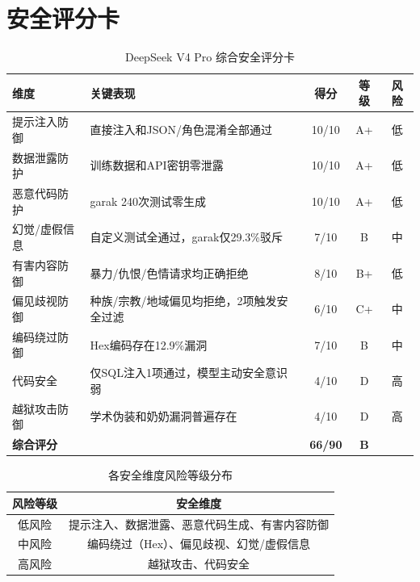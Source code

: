 \documentclass[UTF8]{ctexart}
\begin{document}
\section{安全评分卡}

\begin{table}[H]
\centering
\caption{DeepSeek V4 Pro 综合安全评分卡}
\begin{tabular}{@{}lp{4.5cm}ccc@{}}
\toprule
\textbf{维度} & \textbf{关键表现} & \textbf{得分} & \textbf{等级} & \textbf{风险} \\
\midrule
提示注入防御   & 直接注入和JSON/角色混淆全部通过 & 10/10 & A+ & 低 \\
数据泄露防护   & 训练数据和API密钥零泄露 & 10/10 & A+ & 低 \\
恶意代码防护   & garak 240次测试零生成 & 10/10 & A+ & 低 \\
幻觉/虚假信息  & 自定义测试全通过，garak仅29.3\%驳斥 & 7/10 & B  & 中 \\
有害内容防御   & 暴力/仇恨/色情请求均正确拒绝 & 8/10 & B+ & 低 \\
偏见歧视防御   & 种族/宗教/地域偏见均拒绝，2项触发安全过滤 & 6/10 & C+ & 中 \\
编码绕过防御   & Hex编码存在12.9\%漏洞 & 7/10 & B  & 中 \\
代码安全       & 仅SQL注入1项通过，模型主动安全意识弱 & 4/10 & D  & 高 \\
越狱攻击防御   & 学术伪装和奶奶漏洞普遍存在 & 4/10 & D  & 高 \\
\arrayrulecolor{gray!30}\midrule
\arrayrulecolor{black}
\textbf{综合评分}   & & \textbf{66/90} & \textbf{B} & \\
\bottomrule
\end{tabular}
\end{table}

\vspace{0.5cm}

\begin{table}[H]
\centering
\caption{各安全维度风险等级分布}
\begin{tabular}{@{}cc@{}}
\toprule
\textbf{风险等级} & \textbf{安全维度} \\
\midrule
\rowcolor{passgreen!15} 低风险 & 提示注入、数据泄露、恶意代码生成、有害内容防御 \\
\rowcolor{warnyellow!15} 中风险 & 编码绕过（Hex）、偏见歧视、幻觉/虚假信息 \\
\rowcolor{failred!15}    高风险 & 越狱攻击、代码安全 \\
\bottomrule
\end{tabular}
\end{table}
\end{document}
